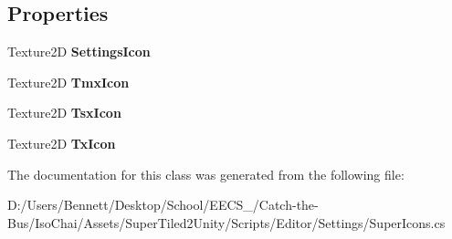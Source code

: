 \subsection*{Properties}
\begin{DoxyCompactItemize}
\item 
\mbox{\label{class_super_tiled2_unity_1_1_editor_1_1_super_icons_ab0007d1969346f3ddacd21c019c62e06}} 
Texture2D {\bfseries Settings\+Icon}
\item 
\mbox{\label{class_super_tiled2_unity_1_1_editor_1_1_super_icons_ad481cb335f242bd98f3780124d491203}} 
Texture2D {\bfseries Tmx\+Icon}
\item 
\mbox{\label{class_super_tiled2_unity_1_1_editor_1_1_super_icons_a739db53396db2fb6502bf4ec88a665d3}} 
Texture2D {\bfseries Tsx\+Icon}
\item 
\mbox{\label{class_super_tiled2_unity_1_1_editor_1_1_super_icons_a78117960de9938d7174d4f73db402a35}} 
Texture2D {\bfseries Tx\+Icon}
\end{DoxyCompactItemize}


The documentation for this class was generated from the following file\+:\begin{DoxyCompactItemize}
\item 
D\+:/\+Users/\+Bennett/\+Desktop/\+School/\+E\+E\+C\+S\+\_/\+Catch-\/the-\/\+Bus/\+Iso\+Chai/\+Assets/\+Super\+Tiled2\+Unity/\+Scripts/\+Editor/\+Settings/Super\+Icons.\+cs\end{DoxyCompactItemize}
